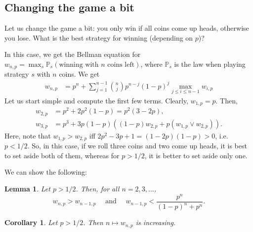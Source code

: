 \documentclass{article}
\newtheorem{lemma}[proposition]{Lemma}
\newtheorem{corollary}[proposition]{Corollary}
\theoremstyle{definition}
\theoremstyle{step} \newtheorem{step}{Step}
\begin{document}
\subsection*{Changing the game a bit}
Let us change the game a bit: you only win if all coins come up heads,
otherwise you lose. What is the best strategy for winning (depending
on $p$)?

In this case, we get the Bellman equation for
$w_{n,p} = \max_s \mathbb P_s(\text{winning with $n$ coins left})$,
where $\mathbb P_s$ is the law when playing strategy $s$ with $n$
coins. We get
\begin{align}\label{eq:wn}
  w_{n,p} & = p^n + \sum_{j=1}^{n-1} \binom n j p^{n-j} (1-p)^j \max_{j\leq i\leq n-1} w_{i,p}
\end{align}
Let us start simple and compute the first few terms. Clearly, $w_{1,p}
= p$. Then,
\begin{align*}
  w_{2,p} & = p^2 + 2p^2(1-p) = p^2(3 - 2p), \\ w_{3,p} & = p^3 +
  3p(1-p)((1-p)w_{2,p} + p (w_{1,p} \vee w_{2,p})).
\end{align*}
Here, note that $w_{1,p} > w_{2,p}$ iff $2p^2 - 3p + 1 = (1 -
2p)(1-p)> 0$, i.e.\ $p < 1/2$. So, in this case, if we roll three
coins and two come up heads, it is best to set aside both of them,
whereas for $p > 1/2$, it is better to set aside only one.

We can show the following:

\begin{lemma}\label{l1}
  Let $p>1/2$. Then, for all $n=2,3,...$,
  $$ w_{n,p} > w_{n-1,p} \quad \text{ and } \quad w_{n-1,p} <
  \frac{p^n}{(1-p)^n + p^n}.$$
\end{lemma}

\begin{corollary}
  Let $p>1/2$. Then $n\mapsto w_{n,p}$ is increasing.
\end{corollary}
\end{document}
